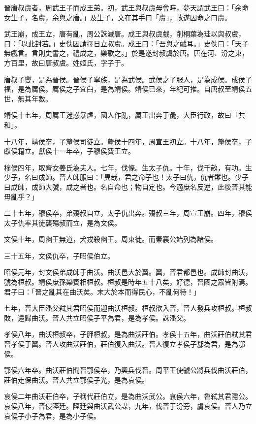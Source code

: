 
\begin{pinyinscope}
晉唐叔虞者，周武王子而成王弟。初，武王與叔虞母會時，夢天謂武王曰：「余命女生子，名虞，余與之唐。」及生子，文在其手曰「虞」，故遂因命之曰虞。

武王崩，成王立，唐有亂，周公誅滅唐。成王與叔虞戲，削桐葉為珪以與叔虞，曰：「以此封若。」史佚因請擇日立叔虞。成王曰：「吾與之戲耳。」史佚曰：「天子無戲言。言則史書之，禮成之，樂歌之。」於是遂封叔虞於唐。唐在河、汾之東，方百里，故曰唐叔虞。姓姬氏，字子于。

唐叔子燮，是為晉侯。晉侯子寧族，是為武侯。武侯之子服人，是為成侯。成侯子福，是為厲侯。厲侯之子宜臼，是為靖侯。靖侯已來，年紀可推。自唐叔至靖侯五世，無其年數。

靖侯十七年，周厲王迷惑暴虐，國人作亂，厲王出奔于彘，大臣行政，故曰「共和」。

十八年，靖侯卒，子釐侯司徒立。釐侯十四年，周宣王初立。十八年，釐侯卒，子獻侯籍立。獻侯十一年卒，子穆侯費王立。

穆侯四年，取齊女姜氏為夫人。七年，伐條。生太子仇。十年，伐千畝，有功。生少子，名曰成師。晉人師服曰：「異哉，君之命子也！太子曰仇，仇者讎也。少子曰成師，成師大號，成之者也。名自命也；物自定也。今適庶名反逆，此後晉其能毋亂乎？」

二十七年，穆侯卒，弟殤叔自立，太子仇出奔。殤叔三年，周宣王崩。四年，穆侯太子仇率其徒襲殤叔而立，是為文侯。

文侯十年，周幽王無道，犬戎殺幽王，周東徙。而秦襄公始列為諸侯。

三十五年，文侯仇卒，子昭侯伯立。

昭侯元年，封文侯弟成師于曲沃。曲沃邑大於翼。翼，晉君都邑也。成師封曲沃，號為桓叔。靖侯庶孫欒賓相桓叔。桓叔是時年五十八矣，好德，晉國之眾皆附焉。君子曰：「晉之亂其在曲沃矣。末大於本而得民心，不亂何待！」

七年，晉大臣潘父弒其君昭侯而迎曲沃桓叔。桓叔欲入晉，晉人發兵攻桓叔。桓叔敗，還歸曲沃。晉人共立昭侯子平為君，是為孝侯。誅潘父。

孝侯八年，曲沃桓叔卒，子胛桓叔，是為曲沃莊伯。孝侯十五年，曲沃莊伯弒其君晉孝侯于翼。晉人攻曲沃莊伯，莊伯復入曲沃。晉人復立孝侯子郄為君，是為鄂侯。

鄂侯六年卒。曲沃莊伯聞晉鄂侯卒，乃興兵伐晉。周平王使虢公將兵伐曲沃莊伯，莊伯走保曲沃。晉人共立鄂侯子光，是為哀侯。

哀侯二年曲沃莊伯卒，子稱代莊伯立，是為曲沃武公。哀侯六年，魯弒其君隱公。哀侯八年，晉侵陘廷。陘廷與曲沃武公謀，九年，伐晉于汾旁，虜哀侯。晉人乃立哀侯子小子為君，是為小子侯。


\end{pinyinscope}
